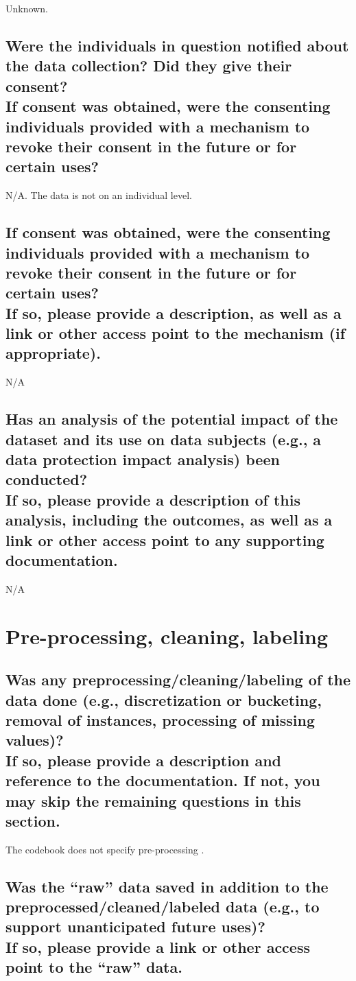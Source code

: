 \documentclass[letterpaper, 10 pt, conference]{ieeeconf}  %
\newcommand{\subtitle}[1]{{\\ \small \normalfont \color{purple} #1}}
\begin{document}
Unknown.

\subsection{Were the individuals in question notified about the data collection? Did they give their consent? \subtitle{If consent was obtained, were the consenting individuals provided with a mechanism to revoke their consent in the future or for certain uses?}}

N/A. The data is not on an individual level. 

\subsection{If consent was obtained, were the consenting individuals provided with a mechanism to revoke their consent in the future or for certain uses? \subtitle{If so, please provide a description, as well as a link or other access point to the mechanism (if appropriate).}}

N/A

\subsection{Has an analysis of the potential impact of the dataset and its use on data subjects (e.g., a data protection impact analysis) been conducted? \subtitle{If so, please provide a description of this analysis, including the outcomes, as well as a link or other access point to any supporting documentation.}}

N/A

\section{Pre-processing, cleaning, labeling}

\subsection{Was any preprocessing/cleaning/labeling of the data done (e.g., discretization or bucketing, removal of instances, processing of missing values)? \subtitle{If so, please provide a description and reference to the documentation. If not, you may skip the remaining questions in this section.}}

The codebook does not specify pre-processing \cite{codebook}.

\subsection{Was the “raw” data saved in addition to the preprocessed/cleaned/labeled data (e.g., to support unanticipated future uses)? \subtitle{If so, please provide a link or other access point to the “raw” data. }}
\end{document}
